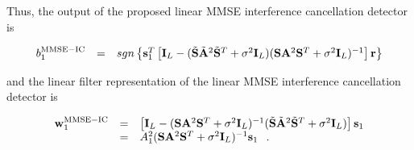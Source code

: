 \documentclass[a4paper,10pt,fleqn, twocolumn]{IEEETran}
\newcommand{\br}{{\mathbf r}}
\newcommand{\bA}{{\mathbf A}}
\newcommand{\bs}{{\bf s}}
\newcommand{\bw}{{\bf w}}
\newcommand{\bS}{{\bf S}}
\newcommand{\bI}{{\bf I}}
\begin{document}
Thus, the output of the proposed linear MMSE interference
cancellation detector is

\begin{equation}
\begin{array}{rcl}
b_1^{\rm MMSE-IC}&=&\mbox{sgn}\left\{\bs_1^T
\left[\bI_L-(\tilde{\bS}\tilde{\bA}^2\tilde{\bS}^T+\sigma^2\bI_L)(\bS\bA^2\bS^T+\sigma^2\bI_L)^{-1}\right]\br\right\}
\end{array}
\end{equation}

\noindent and the linear filter representation of the linear MMSE
interference cancellation detector is

\begin{equation}
\begin{array}{rcl}
\bw_1^{\rm MMSE-IC}&=&\left[\bI_L-(\bS\bA^2\bS^T+\sigma^2\bI_L)^{-1}(\tilde{\bS}\tilde{\bA}^2\tilde{\bS}^T+\sigma^2\bI_L)\right]\bs_1\\
&=&A_1^2(\bS\bA^2\bS^T+\sigma^2\bI_L)^{-1}\bs_1 \hspace{0.1in}.
\end{array}\label{w_MMSEIC}
\end{equation}
\end{document}
